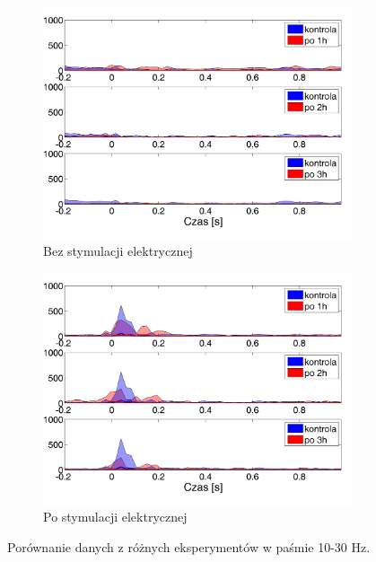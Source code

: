 \documentclass{pracamgr_2}
\begin{document}
\begin{figure}[h]
	\begin{subfigure}{.5\textwidth}
		\centering
		\includegraphics[width=1.\linewidth]{kontrola15_10-30_z_SC2_do_CxC10.png}
		\caption{Bez stymulacji elektrycznej}
		\label{rys:kon_SC_CxC}
	\end{subfigure}%
	\begin{subfigure}{.5\textwidth}
		\centering
		\includegraphics[width=1.\linewidth]{beta3_10-30_z_SC2_do_CxC8.png}
		\caption{Po stymulacji elektrycznej}
		\label{rys:beta_SC_CxC}
	\end{subfigure}
	\caption{Porównanie danych z różnych eksperymentów w paśmie 10-30 Hz.}
	\label{rys:10_30_SC_CxC}
\end{figure}
\end{document}
